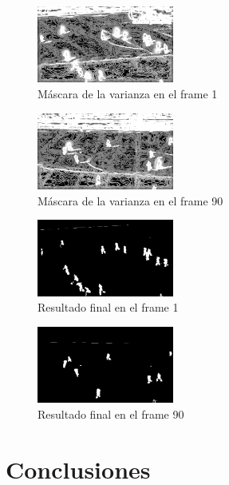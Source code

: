 \documentclass{IEEEtran}
\begin{document}
\begin{figure}[!ht]
  \caption{M\'ascara de la varianza en el frame 1}
  \centering
    \includegraphics[width=0.4\textwidth]{frameVarianza.png}
\end{figure}

\begin{figure}[!ht]
  \caption{M\'ascara de la varianza en el frame 90}
  \centering
    \includegraphics[width=0.4\textwidth]{frameVarianza90.png}
\end{figure}

\begin{figure}[!ht]
  \caption{Resultado final en el frame 1}
  \centering
    \includegraphics[width=0.4\textwidth]{frameFinal.png}
\end{figure}

\begin{figure}[!ht]
  \caption{Resultado final en el frame 90}
  \centering
    \includegraphics[width=0.4\textwidth]{frameFinal90.png}
\end{figure}

\newpage

\section{Conclusiones}
\end{document}
